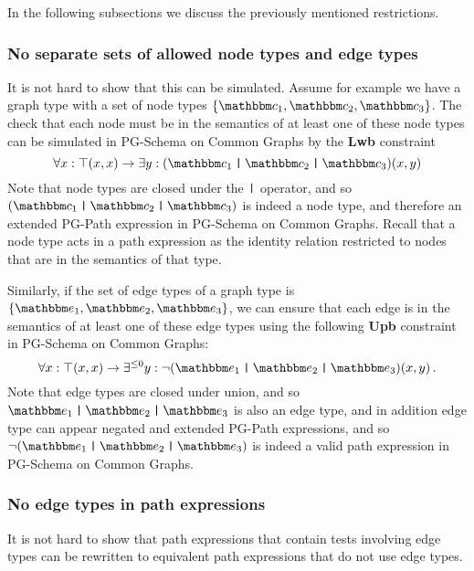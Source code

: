 In the following subsections we discuss the previously mentioned restrictions.

\subsubsection{No separate sets of allowed node types and edge types}

It is not hard to show that this can be simulated. 
Assume for example we have a graph type with a set of node types $\{ \ntype_1, \ntype_2, \ntype_3 \}$.
The check that each node must be in the semantics of at least one of these node types can be simulated in PG-Schema on Common Graphs by 
the \textbf{Lwb} constraint $$\forall x : \top(x, x) \to \exists y : (\ntype_1 \tOr \ntype_2 \tOr \ntype_3)(x, y)$$ 
Note that node types are closed under the $\mathbin{\texttt{|}}$ operator, and so $(\ntype_1 \tOr \ntype_2 \tOr \ntype_3)$ is indeed a node type, and therefore an extended PG-Path expression in PG-Schema on Common Graphs.
Recall that a node type acts in a path expression as the identity relation restricted to nodes that are in the semantics of that type.

Similarly, if the set of edge types of a graph type is $\{ \etype_1, \etype_2, \etype_3 \}$, we can ensure that each edge is in the semantics of at least one of these edge types using the following \textbf{Upb} constraint in PG-Schema on Common Graphs: 
$$\forall x : \top(x, x) \to \exists^{\leq 0} y : \lnot(\etype_1 \tOr \etype_2 \tOr \etype_3)(x, y)\,.$$
Note that edge types are closed under union, and so $\etype_1 \tOr \etype_2 \tOr \etype_3$ is also an edge type, and in addition edge type can appear negated and extended PG-Path expressions, and so $\lnot(\etype_1 \tOr \etype_2 \tOr \etype_3)$ is indeed a valid path expression in PG-Schema on Common Graphs.


\subsubsection{No edge types in path expressions}

It is not hard to show that path expressions that contain tests involving edge types 
can be rewritten to equivalent path expressions that do not use edge types.

